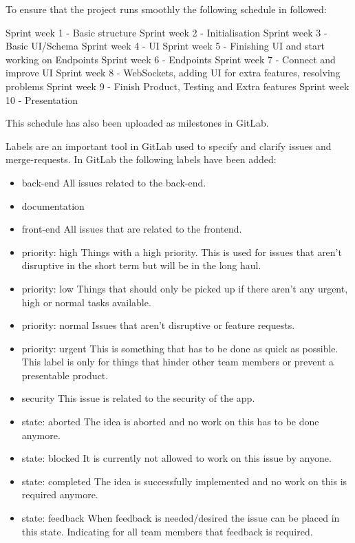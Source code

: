 \documentclass[sigconf,nonacm]{acmart}
\begin{document}
To ensure that the project runs smoothly the following schedule in followed:

Sprint week 1 - Basic structure
Sprint week 2 - Initialisation
Sprint week 3 - Basic UI/Schema
Sprint week 4 - UI
Sprint week 5 - Finishing UI and start working on Endpoints
Sprint week 6 - Endpoints
Sprint week 7 - Connect and improve UI
Sprint week 8 - WebSockets, adding UI for extra features, resolving problems
Sprint week 9 - Finish Product, Testing and Extra features
Sprint week 10 - Presentation

This schedule has also been uploaded as milestones in GitLab.

Labels are an important tool in GitLab used to specify and clarify issues and merge-requests. In GitLab the following labels have been added:

\begin{itemize}
    \item back-end              All issues related to the back-end.
    \item documentation
    \item front-end             All issues that are related to the frontend.
    \item priority: high        Things with a high priority. This is used for issues that aren't disruptive in the short term but will be in the long haul.
    \item priority: low         Things that should only be picked up if there aren't any urgent, high or normal tasks available.
    \item priority: normal      Issues that aren't disruptive or feature requests.
    \item priority: urgent      This is something that has to be done as quick as possible. This label is only for things that hinder other team members or prevent a presentable product.
    \item security              This issue is related to the security of the app.
    \item state: aborted        The idea is aborted and no work on this has to be done anymore.
    \item state: blocked        It is currently not allowed to work on this issue by anyone.
    \item state: completed      The idea is successfully implemented and no work on this is required anymore.
    \item state: feedback       When feedback is needed/desired the issue can be placed in this state. Indicating for all team members that feedback is required.

\end{itemize}
\end{document}
